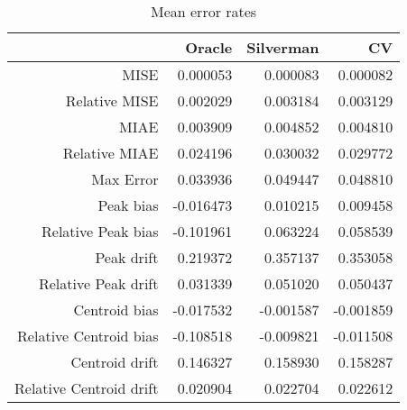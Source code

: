 \begin{table}[ht]
\centering
\begin{tabular}{rrrr}
  \hline
 & Oracle & Silverman & CV \\ 
  \hline
MISE & 0.000053 & 0.000083 & 0.000082 \\ 
  Relative MISE & 0.002029 & 0.003184 & 0.003129 \\ 
  MIAE & 0.003909 & 0.004852 & 0.004810 \\ 
  Relative MIAE & 0.024196 & 0.030032 & 0.029772 \\ 
  Max Error & 0.033936 & 0.049447 & 0.048810 \\ 
  Peak bias & -0.016473 & 0.010215 & 0.009458 \\ 
  Relative Peak bias & -0.101961 & 0.063224 & 0.058539 \\ 
  Peak drift & 0.219372 & 0.357137 & 0.353058 \\ 
  Relative Peak drift & 0.031339 & 0.051020 & 0.050437 \\ 
  Centroid bias & -0.017532 & -0.001587 & -0.001859 \\ 
  Relative Centroid bias & -0.108518 & -0.009821 & -0.011508 \\ 
  Centroid drift & 0.146327 & 0.158930 & 0.158287 \\ 
  Relative Centroid drift & 0.020904 & 0.022704 & 0.022612 \\ 
   \hline
\end{tabular}
\caption{Mean error rates} 
\label{tbl:mean_error_rates}
\end{table}
